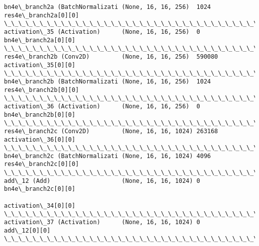 \documentclass[11pt]{article}
\begin{document}
\begin{Verbatim}[commandchars=\\\{\}]
bn4e\_branch2a (BatchNormalizati (None, 16, 16, 256)  1024        res4e\_branch2a[0][0]             
\_\_\_\_\_\_\_\_\_\_\_\_\_\_\_\_\_\_\_\_\_\_\_\_\_\_\_\_\_\_\_\_\_\_\_\_\_\_\_\_\_\_\_\_\_\_\_\_\_\_\_\_\_\_\_\_\_\_\_\_\_\_\_\_\_\_\_\_\_\_\_\_\_\_\_\_\_\_\_\_\_\_\_\_\_\_\_\_\_\_\_\_\_\_\_\_\_\_
activation\_35 (Activation)      (None, 16, 16, 256)  0           bn4e\_branch2a[0][0]              
\_\_\_\_\_\_\_\_\_\_\_\_\_\_\_\_\_\_\_\_\_\_\_\_\_\_\_\_\_\_\_\_\_\_\_\_\_\_\_\_\_\_\_\_\_\_\_\_\_\_\_\_\_\_\_\_\_\_\_\_\_\_\_\_\_\_\_\_\_\_\_\_\_\_\_\_\_\_\_\_\_\_\_\_\_\_\_\_\_\_\_\_\_\_\_\_\_\_
res4e\_branch2b (Conv2D)         (None, 16, 16, 256)  590080      activation\_35[0][0]              
\_\_\_\_\_\_\_\_\_\_\_\_\_\_\_\_\_\_\_\_\_\_\_\_\_\_\_\_\_\_\_\_\_\_\_\_\_\_\_\_\_\_\_\_\_\_\_\_\_\_\_\_\_\_\_\_\_\_\_\_\_\_\_\_\_\_\_\_\_\_\_\_\_\_\_\_\_\_\_\_\_\_\_\_\_\_\_\_\_\_\_\_\_\_\_\_\_\_
bn4e\_branch2b (BatchNormalizati (None, 16, 16, 256)  1024        res4e\_branch2b[0][0]             
\_\_\_\_\_\_\_\_\_\_\_\_\_\_\_\_\_\_\_\_\_\_\_\_\_\_\_\_\_\_\_\_\_\_\_\_\_\_\_\_\_\_\_\_\_\_\_\_\_\_\_\_\_\_\_\_\_\_\_\_\_\_\_\_\_\_\_\_\_\_\_\_\_\_\_\_\_\_\_\_\_\_\_\_\_\_\_\_\_\_\_\_\_\_\_\_\_\_
activation\_36 (Activation)      (None, 16, 16, 256)  0           bn4e\_branch2b[0][0]              
\_\_\_\_\_\_\_\_\_\_\_\_\_\_\_\_\_\_\_\_\_\_\_\_\_\_\_\_\_\_\_\_\_\_\_\_\_\_\_\_\_\_\_\_\_\_\_\_\_\_\_\_\_\_\_\_\_\_\_\_\_\_\_\_\_\_\_\_\_\_\_\_\_\_\_\_\_\_\_\_\_\_\_\_\_\_\_\_\_\_\_\_\_\_\_\_\_\_
res4e\_branch2c (Conv2D)         (None, 16, 16, 1024) 263168      activation\_36[0][0]              
\_\_\_\_\_\_\_\_\_\_\_\_\_\_\_\_\_\_\_\_\_\_\_\_\_\_\_\_\_\_\_\_\_\_\_\_\_\_\_\_\_\_\_\_\_\_\_\_\_\_\_\_\_\_\_\_\_\_\_\_\_\_\_\_\_\_\_\_\_\_\_\_\_\_\_\_\_\_\_\_\_\_\_\_\_\_\_\_\_\_\_\_\_\_\_\_\_\_
bn4e\_branch2c (BatchNormalizati (None, 16, 16, 1024) 4096        res4e\_branch2c[0][0]             
\_\_\_\_\_\_\_\_\_\_\_\_\_\_\_\_\_\_\_\_\_\_\_\_\_\_\_\_\_\_\_\_\_\_\_\_\_\_\_\_\_\_\_\_\_\_\_\_\_\_\_\_\_\_\_\_\_\_\_\_\_\_\_\_\_\_\_\_\_\_\_\_\_\_\_\_\_\_\_\_\_\_\_\_\_\_\_\_\_\_\_\_\_\_\_\_\_\_
add\_12 (Add)                    (None, 16, 16, 1024) 0           bn4e\_branch2c[0][0]              
                                                                 activation\_34[0][0]              
\_\_\_\_\_\_\_\_\_\_\_\_\_\_\_\_\_\_\_\_\_\_\_\_\_\_\_\_\_\_\_\_\_\_\_\_\_\_\_\_\_\_\_\_\_\_\_\_\_\_\_\_\_\_\_\_\_\_\_\_\_\_\_\_\_\_\_\_\_\_\_\_\_\_\_\_\_\_\_\_\_\_\_\_\_\_\_\_\_\_\_\_\_\_\_\_\_\_
activation\_37 (Activation)      (None, 16, 16, 1024) 0           add\_12[0][0]                     
\_\_\_\_\_\_\_\_\_\_\_\_\_\_\_\_\_\_\_\_\_\_\_\_\_\_\_\_\_\_\_\_\_\_\_\_\_\_\_\_\_\_\_\_\_\_\_\_\_\_\_\_\_\_\_\_\_\_\_\_\_\_\_\_\_\_\_\_\_\_\_\_\_\_\_\_\_\_\_\_\_\_\_\_\_\_\_\_\_\_\_\_\_\_\_\_\_\_

\end{Verbatim}
\end{document}
